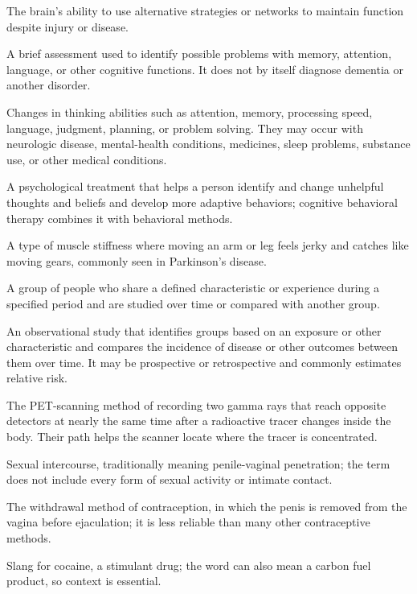  The brain's ability to use alternative strategies or networks to maintain function despite injury or disease.

 A brief assessment used to identify possible problems with memory, attention, language, or other cognitive functions. It does not by
itself diagnose dementia or another disorder.

 Changes in thinking abilities such as attention, memory, processing speed, language, judgment, planning, or problem solving. They may occur with neurologic disease, mental-health conditions, medicines, sleep problems, substance use, or other medical conditions.

 A psychological treatment that helps a person identify and change unhelpful thoughts and beliefs and develop more adaptive behaviors; cognitive behavioral therapy combines it with behavioral methods.

 A type of muscle stiffness where moving an arm or leg feels jerky and catches like moving gears, commonly seen in Parkinson's disease.

 A group of people who share a defined characteristic or experience during a specified period and are studied over time or compared with another group.

 An observational study that identifies groups based on an exposure or other characteristic and compares the incidence of disease or other outcomes between them over time. It may be prospective or retrospective and commonly estimates relative risk.

 The PET-scanning method of recording two gamma rays that reach opposite detectors at nearly the same time after a radioactive tracer changes inside the body. Their path helps the scanner locate where the tracer is concentrated.

 Sexual intercourse, traditionally meaning penile-vaginal penetration; the term does not include every form of sexual activity or intimate contact.

 The withdrawal method of contraception, in which the penis is removed from the vagina before ejaculation; it is less reliable than many other contraceptive methods.

 Slang for cocaine, a stimulant drug; the word can also mean a carbon fuel product, so context is essential.

